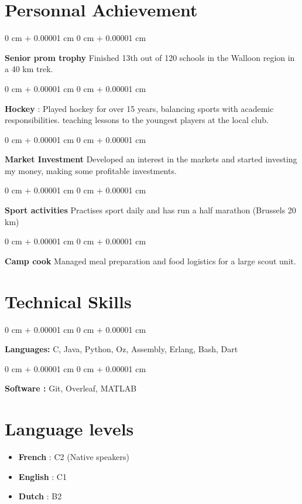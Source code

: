 \documentclass[10pt, letterpaper]{article}
\newenvironment{onecolentry}{
    \begin{adjustwidth}{
        0 cm + 0.00001 cm
    }{
        0 cm + 0.00001 cm
    }
}{
    \end{adjustwidth}
} %
\begin{document}
    \section{Personnal Achievement}
        \begin{onecolentry}
            \textbf{Senior prom trophy} Finished 13th out of 120 schools in the Walloon region in a 40 km trek.
        \end{onecolentry}
        \begin{onecolentry}
            \textbf{Hockey} : Played hockey for over 15 years, balancing sports with academic responsibilities. teaching lessons to the youngest players at the local club.
        \end{onecolentry}
        \begin{onecolentry}
            \textbf{Market Investment} Developed an interest in the markets and started investing my money, making some profitable investments.
        \end{onecolentry}
        \begin{onecolentry}
            \textbf{Sport activities} Practises sport daily and has run a half marathon (Brussels 20 km)
        \end{onecolentry}
        \begin{onecolentry}
            \textbf{Camp cook} Managed meal preparation and food logistics for a large scout unit.
        \end{onecolentry}

        \vspace{0.2 cm}

        
        

        

    
    \section{Technical Skills}



        
        \begin{onecolentry}
            \textbf{Languages:} C, Java, Python, Oz, Assembly, Erlang, Bash, Dart
        \end{onecolentry}

        \vspace{0.2 cm}

        \begin{onecolentry}
            \textbf{Software :} Git, Overleaf, MATLAB
        \end{onecolentry}
    \section{Language levels}
    \begin{itemize}
        \item \textbf{French} : C2 (Native speakers) 
        \item \textbf{English} : C1
        \item \textbf{Dutch} : B2 
        
    \end{itemize}



    
\end{document}
